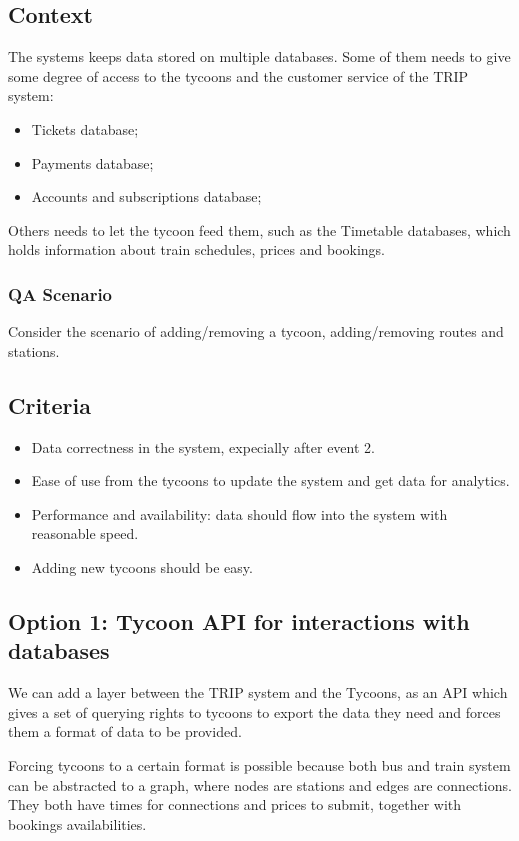 \subsection*{Context}
The systems keeps data stored on multiple databases. 
Some of them needs to give some degree of access to the tycoons and the customer service of the TRIP system:
\begin{itemize}
    \item Tickets database;
    \item Payments database;
    \item Accounts and subscriptions database;
\end{itemize}

Others needs to let the tycoon feed them, such as the Timetable databases, which holds information about train schedules,
prices and bookings.

\subsubsection*{QA Scenario} %
Consider the scenario of adding/removing a tycoon, adding/removing routes and stations.
\subsection*{Criteria}
\begin{itemize}
    \item Data correctness in the system, expecially after event 2.
    \item Ease of use from the tycoons to update the system and get data for analytics.
    \item Performance and availability: data should flow into the system with reasonable speed.
    \item Adding new tycoons should be easy.
\end{itemize}

\subsection*{Option 1: Tycoon API for interactions with databases}

We can add a layer between the TRIP system and the Tycoons, as an API which gives a set of querying rights to tycoons to export the data they need and forces them a format of data to be provided.

Forcing tycoons to a certain format is possible because both bus and train system can be abstracted to a graph, where nodes are stations and edges are connections.
They both have times for connections and prices to submit, together with bookings availabilities.
